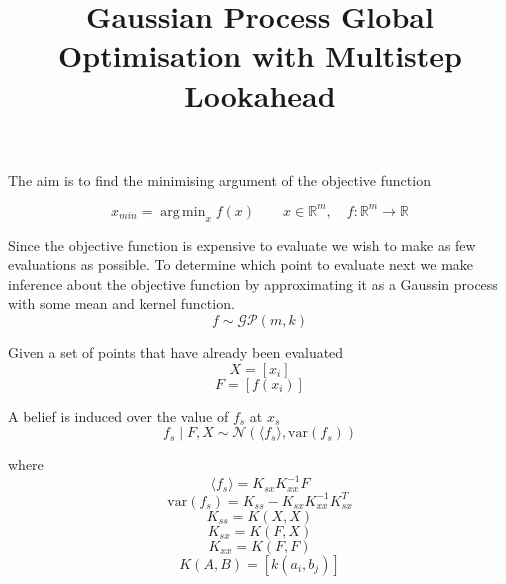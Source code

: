 \documentclass[11pt]{article}
\title{\textbf{Gaussian Process Global Optimisation with Multistep Lookahead
}}
\author{}
\date{}
\DeclareMathOperator*{\argmin}{arg\,min}
\begin{document}
\maketitle



\section{}

The aim is to find the minimising argument of the objective function

\begin{equation}
x_{min}=\argmin_{x}f(x)\qquad\mathbf{\mathit{x}}\in\mathbb{R^{\mathit{m}}},\quad f:\mathbb{R^{\mathit{m}}}\rightarrow\mathbb{R}
\end{equation}

Since the objective function is expensive to evaluate we wish to make as few evaluations as possible. To determine which point to evaluate next we make inference about the objective function by approximating it as a Gaussin process with some mean and kernel function.
\begin{equation}
f \sim \mathcal{GP}(m,k)
\end{equation}

Given a set of points that have already been evaluated
\begin{equation}
X	=\left[x_{i}\right]
\end{equation}
\begin{equation}
F	=\left[f\left(x_{i}\right)\right]
\end{equation}

A belief is induced over the value of $f_{s}$ at $x_{s}$
\begin{equation}
 f_{s}\mid F,X\sim\mathcal{N}\left( \langle f_{s}\rangle ,\mathrm{var}(f_{s})\right)
\end{equation} 

where
\begin{equation}
\langle f_{s}\rangle 	=K_{sx}K_{xx}^{-1}F
\end{equation}
\begin{equation}
\mathrm{var}\left(f_{s}\right)	=K_{ss}-K_{sx} K_{xx}^{-1} K_{sx}^{T}
\end{equation}
\begin{equation}
K_{ss}	=K\left(X,X\right)
\end{equation}
\begin{equation}
K_{sx}	=K\left(F,X\right)
\end{equation}
\begin{equation}
K_{xx}	=K\left(F,F\right)
\end{equation}
\begin{equation}
K\left(A,B\right)	=\left[k(a_{i},b_{j})\right]
\end{equation} 
\end{document}
